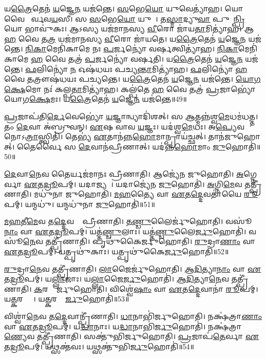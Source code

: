 𑌯\ul{𑌤𑍍𑌰𑍈}𑌤𑍇𑌨॑ \ul{𑌯}𑌜𑍍𑌞𑍇\ul{𑌨} 𑌯𑌜॑𑌨𑍍𑌤𑍇।
\ul{𑌸}𑌭𑍇\ul{𑌯𑍋} 𑌯𑍁𑌵𑍇𑌤𑍍𑌯𑌾॑𑌹।
𑌯𑍋 𑌵𑍈 𑌪𑍂᳚𑌰𑍍𑌵𑌵\ul{𑌯}𑌸𑍀।
𑌸 \ul{𑌸}𑌭𑍇\ul{𑌯𑍋} 𑌯𑍁𑌵𑌾᳚।
𑌤\ul{𑌸𑍍𑌮𑌾}𑌦𑍍𑌯𑍁\ul{𑌵𑌾} 𑌪𑍁𑌮𑌾᳚\ul{𑌨𑍍𑌪𑍍𑌰𑌿}𑌯𑍋 𑌭𑌾𑌵𑍁॑𑌕𑌃।
𑌆𑌽𑌸𑍍𑌯 𑌯𑌜॑𑌮𑌾𑌨𑌸𑍍𑌯 \ul{𑌵𑍀}𑌰𑍋 𑌜𑌾॑𑌯\ul{𑌤𑌾}𑌮𑌿𑌤𑍍𑌯𑌾॑𑌹।
𑌆 \ul{𑌹} 𑌵𑍈 𑌤\ul{𑌤𑍍𑌰} 𑌯𑌜॑𑌮𑌾𑌨𑌸𑍍𑌯 \ul{𑌵𑍀}𑌰𑍋 𑌜𑌾॑𑌯𑌤𑍇।
𑌯\ul{𑌤𑍍𑌰𑍈}𑌤𑍇𑌨॑ \ul{𑌯}𑌜𑍍𑌞𑍇\ul{𑌨} 𑌯𑌜॑𑌨𑍍𑌤𑍇।
\ul{𑌨𑌿}\ul{𑌕𑌾}𑌮𑍇𑌨𑌿॑𑌕𑌾𑌮𑍇 𑌨𑌃 \ul{𑌪}𑌰𑍍𑌜𑌨𑍍𑌯𑍋॑ 𑌵𑌰𑍍\mbox{}\ul{𑌷}𑌤𑍍𑌵𑌿𑌤𑍍𑌯𑌾॑𑌹।
\ul{𑌨𑌿}\ul{𑌕𑌾}𑌮𑍇𑌨𑌿॑𑌕𑌾𑌮𑍇 \ul{𑌹} 𑌵𑍈 𑌤𑌤𑍍𑌰॑ \ul{𑌪}𑌰𑍍𑌜𑌨𑍍𑌯𑍋॑ 𑌵𑌰𑍍\mbox{}𑌷𑌤𑌿।
𑌯\ul{𑌤𑍍𑌰𑍈}𑌤𑍇𑌨॑ \ul{𑌯}𑌜𑍍𑌞𑍇\ul{𑌨} 𑌯𑌜॑𑌨𑍍𑌤𑍇।
\ul{𑌫}𑌲𑌿𑌨𑍍𑌯𑍋॑ \ul{𑌨} 𑌓𑌷॑𑌧𑌯𑌃 𑌪𑌚𑍍𑌯\ul{𑌨𑍍𑌤𑌾}𑌮𑌿𑌤𑍍𑌯𑌾॑𑌹।
\ul{𑌫}𑌲𑌿𑌨𑍍𑌯𑍋॑ \ul{𑌹} 𑌵𑍈 𑌤𑌤𑍍𑌰𑍗𑌷॑𑌧𑌯𑌃 𑌪𑌚𑍍𑌯𑌨𑍍𑌤𑍇।
𑌯\ul{𑌤𑍍𑌰𑍈}𑌤𑍇𑌨॑ \ul{𑌯}𑌜𑍍𑌞𑍇\ul{𑌨} 𑌯𑌜॑𑌨𑍍𑌤𑍇।
\ul{𑌯𑍋}\ul{𑌗}\ul{𑌕𑍍𑌷𑍇}𑌮𑍋 𑌨𑌃॑ 𑌕𑌲𑍍𑌪\ul{𑌤𑌾}𑌮𑌿𑌤𑍍𑌯𑌾॑𑌹।
𑌕𑌲𑍍𑌪॑𑌤𑍇 \ul{𑌹} 𑌵𑍈 𑌤𑌤𑍍𑌰॑ \ul{𑌪𑍍𑌰}𑌜𑌾𑌭𑍍𑌯𑍋॑ 𑌯𑍋𑌗\ul{𑌕𑍍𑌷𑍇}𑌮𑌃।
𑌯\ul{𑌤𑍍𑌰𑍈}𑌤𑍇𑌨॑ \ul{𑌯}𑌜𑍍𑌞𑍇\ul{𑌨} 𑌯𑌜॑𑌨𑍍𑌤𑍇॥49॥\anuvakamend[\ul{𑌅}\ul{𑌨}𑌡𑍍𑌵𑌾𑌨𑌿𑌤𑍍𑌯𑌾॑𑌹 𑌜𑌾𑌯𑌤𑍇 𑌵𑌰𑍍‌\mbox{}𑌷𑌤𑌿 \ul{𑌸}𑌪𑍍𑌤 𑌚॑]

\ul{𑌪𑍍𑌰}𑌜𑌾𑌪॑𑌤𑌿\ul{𑌰𑍍𑌦𑍇}𑌵𑍇𑌭𑍍𑌯𑍋॑ \ul{𑌯}𑌜𑍍𑌞𑌾𑌨𑍍𑌵𑍍𑌯𑌾𑌦𑌿॑𑌶𑌤𑍍।
𑌸 \ul{𑌆}𑌤𑍍𑌮𑌨𑍍𑌨॑𑌶𑍍𑌵\ul{𑌮𑍇}𑌧𑌮॑𑌧𑌤𑍍𑌤।
𑌤𑌂 \ul{𑌦𑍇}𑌵𑌾 𑌅॑𑌬𑍍𑌰𑍁𑌵𑌨𑍍।
\ul{𑌏}𑌷 𑌵𑌾𑌵 \ul{𑌯}𑌜𑍍𑌞𑌃।
𑌯𑌦॑𑌶𑍍𑌵\ul{𑌮𑍇}𑌧𑌃।
𑌅\ul{𑌪𑍍𑌯𑍇}𑌵 𑌨𑍋𑌽\ul{𑌤𑍍𑌰𑌾}𑌸𑍍𑌤𑍍𑌵𑌿𑌤𑌿॑।
𑌤𑍇𑌭𑍍𑌯॑ \ul{𑌏}𑌤𑌾𑌨॑𑌨𑍍𑌨\ul{𑌹𑍋}𑌮𑌾𑌨𑍍𑌪𑍍𑌰𑌾𑌯॑𑌚𑍍𑌛𑌤𑍍।
𑌤𑌾𑌨॑𑌜𑍁𑌹𑍋𑌤𑍍।
𑌤𑍈𑌰𑍍𑌵𑍈 𑌸 \ul{𑌦𑍇}𑌵𑌾𑌨॑𑌪𑍍𑌰𑍀𑌣𑌾𑌤𑍍।
𑌯𑌦॑𑌨𑍍𑌨\ul{𑌹𑍋}𑌮𑌾𑌂 \ul{𑌜𑍁}𑌹𑍋𑌤𑌿॑॥50॥

\ul{𑌦𑍇}𑌵𑌾\ul{𑌨𑍇}𑌵 𑌤𑍈𑌰𑍍𑌯𑌜॑𑌮𑌾𑌨𑌃 𑌪𑍍𑌰𑍀𑌣𑌾𑌤𑌿।
𑌆𑌜𑍍𑌯𑍇॑𑌨 𑌜𑍁𑌹𑍋𑌤𑌿।
\ul{𑌅}𑌗𑍍𑌨𑍇𑌰𑍍𑌵𑌾 \ul{𑌏}𑌤\ul{𑌦𑍍𑌰𑍂}𑌪𑌮𑍍।
𑌯𑌦𑌾𑌜𑍍𑌯𑌮𑍍᳚।
𑌯𑌦𑌾𑌜𑍍𑌯𑍇॑𑌨 \ul{𑌜𑍁}𑌹𑍋𑌤𑌿॑।
\ul{𑌅}𑌗𑍍𑌨𑌿\ul{𑌮𑍇}𑌵 𑌤𑌤𑍍𑌪𑍍𑌰𑍀॑𑌣𑌾𑌤𑌿।
𑌮𑌧𑍁॑𑌨𑌾 𑌜𑍁𑌹𑍋𑌤𑌿।
\ul{𑌮}\ul{𑌹}𑌤𑍍𑌯𑍈 𑌵𑌾 \ul{𑌏}𑌤\ul{𑌦𑍍𑌦𑍇}𑌵𑌤𑌾॑𑌯𑍈 \ul{𑌰𑍂}𑌪𑌮𑍍।
𑌯𑌨𑍍𑌮𑌧𑍁॑।
𑌯𑌨𑍍𑌮𑌧𑍁॑𑌨𑌾 \ul{𑌜𑍁}𑌹𑍋𑌤𑌿॑॥51॥

\ul{𑌮}\ul{𑌹}𑌤𑍀\ul{𑌮𑍇}𑌵 𑌤\ul{𑌦𑍍𑌦𑍇}𑌵𑌤𑌾𑌂᳚ 𑌪𑍍𑌰𑍀𑌣𑌾𑌤𑌿।
\ul{𑌤}\ul{𑌣𑍍𑌡𑍁}𑌲𑍈𑌰𑍍𑌜𑍁॑𑌹𑍋𑌤𑌿।
𑌵𑌸𑍂॑\ul{𑌨𑌾𑌂} 𑌵𑌾 \ul{𑌏}𑌤\ul{𑌦𑍍𑌰𑍂}𑌪𑌮𑍍।
𑌯𑌤𑍍𑌤॑\ul{𑌣𑍍𑌡𑍁}𑌲𑌾𑌃।
𑌯𑌤𑍍𑌤॑\ul{𑌣𑍍𑌡𑍁}𑌲𑍈\ul{𑌰𑍍𑌜𑍁}𑌹𑍋𑌤𑌿॑।
𑌵𑌸𑍂॑\ul{𑌨𑍇}𑌵 𑌤𑌤𑍍𑌪𑍍𑌰𑍀॑𑌣𑌾𑌤𑌿।
𑌪𑍃𑌥𑍁॑𑌕𑍈𑌰𑍍𑌜𑍁𑌹𑍋𑌤𑌿।
\ul{𑌰𑍁}𑌦𑍍𑌰𑌾\ul{𑌣𑌾𑌂} 𑌵𑌾 \ul{𑌏}𑌤\ul{𑌦𑍍𑌰𑍂}𑌪𑌮𑍍।
𑌯𑌤𑍍𑌪𑍃𑌥𑍁॑𑌕𑌾𑌃।
𑌯𑌤𑍍𑌪𑍃𑌥𑍁॑𑌕𑍈\ul{𑌰𑍍𑌜𑍁}𑌹𑍋𑌤𑌿॑॥52॥

\ul{𑌰𑍁}𑌦𑍍𑌰𑌾\ul{𑌨𑍇}𑌵 𑌤𑌤𑍍𑌪𑍍𑌰𑍀॑𑌣𑌾𑌤𑌿।
\ul{𑌲𑌾}𑌜𑍈𑌰𑍍𑌜𑍁॑𑌹𑍋𑌤𑌿।
\ul{𑌆}\ul{𑌦𑌿}𑌤𑍍𑌯𑌾\ul{𑌨𑌾𑌂} 𑌵𑌾 \ul{𑌏}𑌤\ul{𑌦𑍍𑌰𑍂}𑌪𑌮𑍍।
𑌯\ul{𑌲𑍍𑌲𑌾}𑌜𑌾𑌃।
𑌯\ul{𑌲𑍍𑌲𑌾}𑌜𑍈\ul{𑌰𑍍𑌜𑍁}𑌹𑍋𑌤𑌿॑।
\ul{𑌆}\ul{𑌦𑌿}𑌤𑍍𑌯𑌾\ul{𑌨𑍇}𑌵 𑌤𑌤𑍍𑌪𑍍𑌰𑍀॑𑌣𑌾𑌤𑌿।
\ul{𑌕}𑌰𑌮𑍍𑌬𑍈᳚𑌰𑍍𑌜𑍁𑌹𑍋𑌤𑌿।
𑌵𑌿𑌶𑍍𑌵𑍇॑\ul{𑌷𑌾𑌂} 𑌵𑌾 \ul{𑌏}𑌤\ul{𑌦𑍍𑌦𑍇}𑌵𑌾𑌨𑌾॑ \ul{𑌰𑍂}𑌪𑌮𑍍।
𑌯\ul{𑌤𑍍𑌕}𑌰𑌮𑍍𑌬𑌾𑌃᳚।
𑌯\ul{𑌤𑍍𑌕}𑌰𑌮𑍍𑌬𑍈᳚\ul{𑌰𑍍𑌜𑍁}𑌹𑍋𑌤𑌿॑॥53॥

𑌵𑌿𑌶𑍍𑌵𑌾॑\ul{𑌨𑍇}𑌵 𑌤\ul{𑌦𑍍𑌦𑍇}𑌵𑌾𑌨𑍍𑌪𑍍𑌰𑍀॑𑌣𑌾𑌤𑌿।
\ul{𑌧𑌾}𑌨𑌾𑌭𑌿॑𑌰𑍍𑌜𑍁𑌹𑍋𑌤𑌿।
𑌨𑌕𑍍𑌷॑𑌤𑍍𑌰𑌾\ul{𑌣𑌾𑌂} 𑌵𑌾 \ul{𑌏}𑌤\ul{𑌦𑍍𑌰𑍂}𑌪𑌮𑍍।
𑌯\ul{𑌦𑍍𑌧𑌾}𑌨𑌾𑌃।
𑌯\ul{𑌦𑍍𑌧𑌾}𑌨𑌾𑌭𑌿॑\ul{𑌰𑍍𑌜𑍁}𑌹𑍋𑌤𑌿॑।
𑌨𑌕𑍍𑌷॑𑌤𑍍𑌰𑌾\ul{𑌣𑍍𑌯𑍇}𑌵 𑌤𑌤𑍍𑌪𑍍𑌰𑍀॑𑌣𑌾𑌤𑌿।
𑌸𑌕𑍍𑌤𑍁॑𑌭𑌿𑌰𑍍𑌜𑍁𑌹𑍋𑌤𑌿।
\ul{𑌪𑍍𑌰}𑌜𑌾𑌪॑\ul{𑌤𑍇}𑌰𑍍𑌵𑌾 \ul{𑌏}𑌤\ul{𑌦𑍍𑌰𑍂}𑌪𑌮𑍍।
𑌯𑌥𑍍𑌸𑌕𑍍𑌤॑𑌵𑌃।
𑌯𑌥𑍍𑌸𑌕𑍍𑌤𑍁॑𑌭𑌿\ul{𑌰𑍍𑌜𑍁}𑌹𑍋𑌤𑌿॑॥54॥

